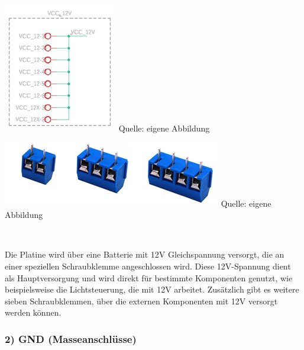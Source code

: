 \documentclass[ngerman,12pt,a4paper]{article}
\begin{document}
			\begin{center}
				\begin{minipage}{0.4\linewidth}
					\centering
					\includegraphics{Pictures/Schaltplan-vcc-12v}
					\label{fig:schaltplan-vcc-12v}
					\small Quelle: eigene Abbildung
				\end{minipage}
				\hfill
				\begin{minipage}{0.5\linewidth}
					\centering
					\includegraphics{Pictures/schraubklemme}
					\label{fig:Schraubklemme}
					\small Quelle: eigene Abbildung
				\end{minipage} \\[0.75cm]
			\end{center} 
		Die Platine wird über eine Batterie mit 12V Gleichspannung versorgt, die an einer speziellen Schraubklemme angeschlossen wird. Diese 12V-Spannung dient als Hauptversorgung und wird direkt für bestimmte Komponenten genutzt, wie beispielsweise die Lichtsteuerung, die mit 12V arbeitet. Zusätzlich gibt es weitere sieben Schraubklemmen, über die externen Komponenten mit 12V versorgt werden können.
			
			\subsubsection*{2) GND (Masseanschlüsse)}
		
\end{document}
